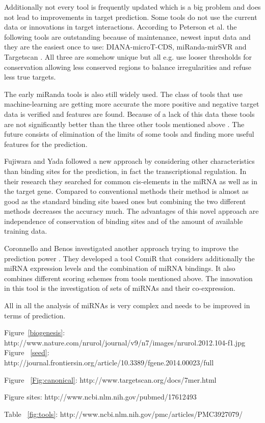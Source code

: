 \documentclass[12pt]{article}
\begin{document}
Additionally not every tool is frequently updated which is a big problem and does not lead to improvements in target prediction. Some tools do not use the current data or innovations in target interactions. According to Peterson et al. the following tools are outstanding because of maintenance, newest input data and they are the easiest once to use: DIANA-microT-CDS, miRanda-mirSVR and Targetscan \cite{Peterson}. All three are somehow unique but all e.g. use looser thresholds for conservation allowing less conserved regions to balance irregularities and refuse less true targets.

The early miRanda tools is also still widely used. The class of tools that use machine-learning are getting more accurate the more positive and negative target data is verified and features are found. Because of a lack of this data these tools are not significantly better than the three other tools mentioned above \cite{Peterson}.
The future consists of elimination of the limits of some tools and finding more useful features for the prediction.

Fujiwara and Yada \cite{Fuji} followed a new approach by considering other characteristics than binding sites for the prediction, in fact the transcriptional regulation. In their research they searched for common cis-elements in the miRNA as well as in the target gene. Compared to conventional methods their method is almost as good as the standard binding site based ones but combining the two different methods decreases the accuracy much. The advantages of this novel approach are independence of conservation of binding sites and of the amount of available training data. 

Coronnello and Benos investigated another approach trying to improve the prediction power \cite{Coronnello}. They developed a tool ComiR that considers additionally the miRNA expression levels and the combination of miRNA bindings. It also combines different scoring schemes from tools mentioned above. The innovation in this tool is the investigation of sets of miRNAs and their co-expression. 

All in all the analysis of miRNAs is very complex and needs to be improved in terms of prediction.


\newpage



\listoffigures


\listoftables


Figure~\ref{biogenesis}: \cite{Kelly} http://www.nature.com/nrurol/journal/v9/n7/images/nrurol.2012.104-f1.jpg
Figure ~\ref{seed}: http://journal.frontiersin.org/article/10.3389/fgene.2014.00023/full

Figure ~\ref{Fig:canonical}: http://www.targetscan.org/docs/7mer.html

Figure sites: http://www.ncbi.nlm.nih.gov/pubmed/17612493

Table ~\ref{fig:tools}: http://www.ncbi.nlm.nih.gov/pmc/articles/PMC3927079/
\end{document}
